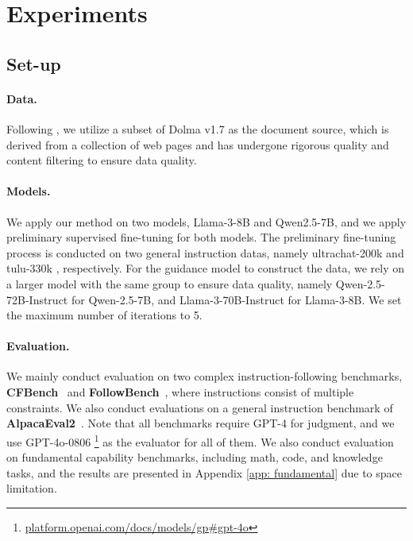 \section{Experiments}
\subsection{Set-up}

\paragraph{Data.} 
Following \citet{nguyen2024better}, we utilize a subset of Dolma v1.7 \cite{dolma-2024} as the document source, which is derived from a collection of web pages and has undergone rigorous quality and content filtering to ensure data quality.

\paragraph{Models.} 
We apply our method on two models, Llama-3-8B and Qwen2.5-7B, and we apply preliminary supervised fine-tuning for both models. The preliminary fine-tuning process is conducted on two general instruction datas, namely ultrachat-200k \cite{ding2023enhancing} and tulu-330k \cite{lambert2024tulu3}, respectively. For the guidance model to construct the data, we rely on a larger model with the same group to ensure data quality, namely Qwen-2.5-72B-Instruct for Qwen-2.5-7B, and Llama-3-70B-Instruct for Llama-3-8B. We set the maximum number of iterations to 5.




\paragraph{Evaluation.} 
We mainly conduct evaluation on two complex instruction-following benchmarks, \textbf{CFBench}~\cite{zhang2024cfbench} and \textbf{FollowBench}~\cite{jiang2023followbench}, where instructions consist of multiple constraints. We also conduct evaluations on a general instruction benchmark of \textbf{AlpacaEval2}~\cite{dubois2024length}. Note that all benchmarks require GPT-4 for judgment, and we use GPT-4o-0806 \footnote{\url{platform.openai.com/docs/models/gp\#gpt-4o}} as the evaluator for all of them. We also conduct evaluation on fundamental capability benchmarks, including math, code, and knowledge tasks, and the results are presented in Appendix \ref{app: fundamental} due to space limitation.

